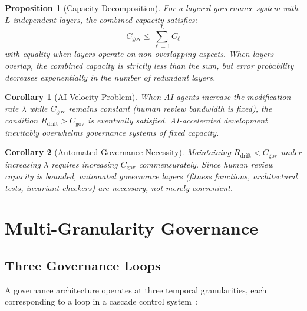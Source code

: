 \documentclass[11pt, a4paper, logo, copyright]{googledeepmind}
\newtheorem{proposition}{Proposition}[section]
\newtheorem{corollary}{Corollary}[section]
\begin{document}
\begin{proposition}[Capacity Decomposition]
\label{prop:decomp}
For a layered governance system with $L$ independent layers, the combined capacity satisfies:
\begin{equation}
    C_{\mathrm{gov}} \leq \sum_{\ell=1}^{L} C_\ell
\end{equation}
with equality when layers operate on non-overlapping aspects. When layers overlap, the combined capacity is strictly less than the sum, but error probability decreases exponentially in the number of redundant layers.
\end{proposition}

\begin{corollary}[AI Velocity Problem]
\label{cor:velocity}
When AI agents increase the modification rate $\lambda$ while $C_{\mathrm{gov}}$ remains constant (human review bandwidth is fixed), the condition $R_{\mathrm{drift}} > C_{\mathrm{gov}}$ is eventually satisfied. AI-accelerated development inevitably overwhelms governance systems of fixed capacity.
\end{corollary}

\begin{corollary}[Automated Governance Necessity]
Maintaining $R_{\mathrm{drift}} < C_{\mathrm{gov}}$ under increasing $\lambda$ requires increasing $C_{\mathrm{gov}}$ commensurately. Since human review capacity is bounded, automated governance layers (fitness functions, architectural tests, invariant checkers) are \emph{necessary}, not merely convenient.
\end{corollary}


\section{Multi-Granularity Governance}
\label{sec:control}

\subsection{Three Governance Loops}

A governance architecture operates at three temporal granularities, each corresponding to a loop in a cascade control system~\citep{seborg2004, hellerstein2004}:
\end{document}
